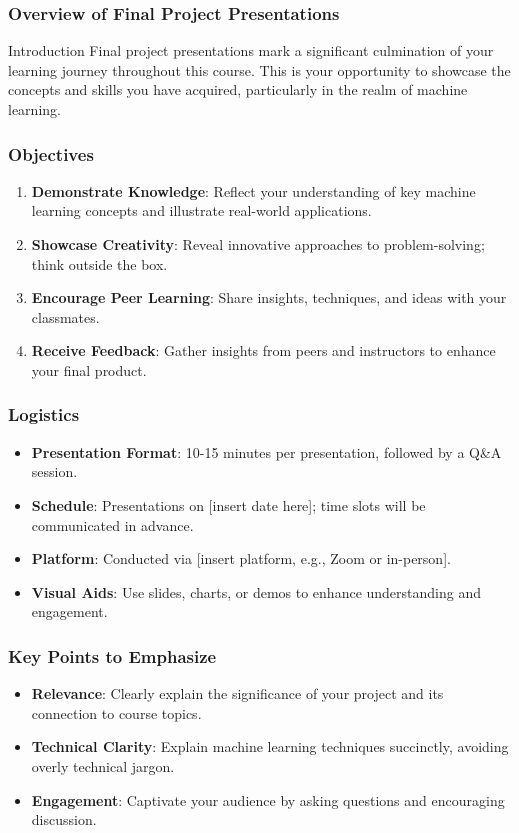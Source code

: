 \documentclass[aspectratio=169]{beamer}
\begin{document}
\frame{\titlepage}

\begin{frame}[fragile]
    \frametitle{Overview of Final Project Presentations}
    \begin{block}{Introduction}
        Final project presentations mark a significant culmination of your learning journey throughout this course. This is your opportunity to showcase the concepts and skills you have acquired, particularly in the realm of machine learning.
    \end{block}
\end{frame}

\begin{frame}[fragile]
    \frametitle{Objectives}
    \begin{enumerate}
        \item \textbf{Demonstrate Knowledge}: Reflect your understanding of key machine learning concepts and illustrate real-world applications.
        \item \textbf{Showcase Creativity}: Reveal innovative approaches to problem-solving; think outside the box.
        \item \textbf{Encourage Peer Learning}: Share insights, techniques, and ideas with your classmates.
        \item \textbf{Receive Feedback}: Gather insights from peers and instructors to enhance your final product.
    \end{enumerate}
\end{frame}

\begin{frame}[fragile]
    \frametitle{Logistics}
    \begin{itemize}
        \item \textbf{Presentation Format}: 10-15 minutes per presentation, followed by a Q\&A session.
        \item \textbf{Schedule}: Presentations on [insert date here]; time slots will be communicated in advance.
        \item \textbf{Platform}: Conducted via [insert platform, e.g., Zoom or in-person].
        \item \textbf{Visual Aids}: Use slides, charts, or demos to enhance understanding and engagement.
    \end{itemize}
\end{frame}

\begin{frame}[fragile]
    \frametitle{Key Points to Emphasize}
    \begin{itemize}
        \item \textbf{Relevance}: Clearly explain the significance of your project and its connection to course topics.
        \item \textbf{Technical Clarity}: Explain machine learning techniques succinctly, avoiding overly technical jargon.
        \item \textbf{Engagement}: Captivate your audience by asking questions and encouraging discussion.
    \end{itemize}
\end{frame}
\end{document}
